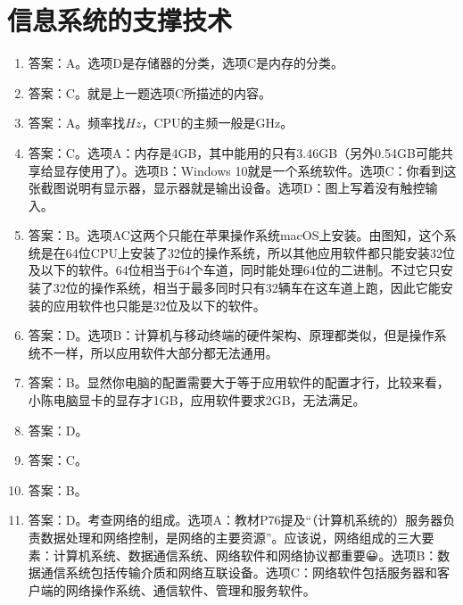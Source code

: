 \section{信息系统的支撑技术}

\begin{enumerate}
\item 答案：A。选项D是存储器的分类，选项C是内存的分类。

\item 答案：C。就是上一题选项C所描述的内容。

\item 答案：A。频率找$Hz$，CPU的主频一般是GHz。

\item 答案：C。选项A：内存是4GB，其中能用的只有3.46GB（另外0.54GB可能共享给显存使用了）。选项B：Windows 10就是一个系统软件。选项C：你看到这张截图说明有显示器，显示器就是输出设备。选项D：图上写着没有触控输入。

\item 答案：B。选项AC这两个只能在苹果操作系统macOS上安装。由图知，这个系统是在64位CPU上安装了32位的操作系统，所以其他应用软件都只能安装32位及以下的软件。64位相当于64个车道，同时能处理64位的二进制。不过它只安装了32位的操作系统，相当于最多同时只有32辆车在这车道上跑，因此它能安装的应用软件也只能是32位及以下的软件。

\item 答案：D。选项B：计算机与移动终端的硬件架构、原理都类似，但是操作系统不一样，所以应用软件大部分都无法通用。

\item 答案：B。显然你电脑的配置需要大于等于应用软件的配置才行，比较来看，小陈电脑显卡的显存才1GB，应用软件要求2GB，无法满足。

\item 答案：D。

\item 答案：C。

\item 答案：B。

\item 答案：D。考查网络的组成。选项A：教材P76提及“（计算机系统的）服务器负责数据处理和网络控制，是网络的主要资源”。应该说，网络组成的三大要素：计算机系统、数据通信系统、网络软件和网络协议都重要😀。选项B：数据通信系统包括传输介质和网络互联设备。选项C：网络软件包括服务器和客户端的网络操作系统、通信软件、管理和服务软件。


\end{enumerate}
